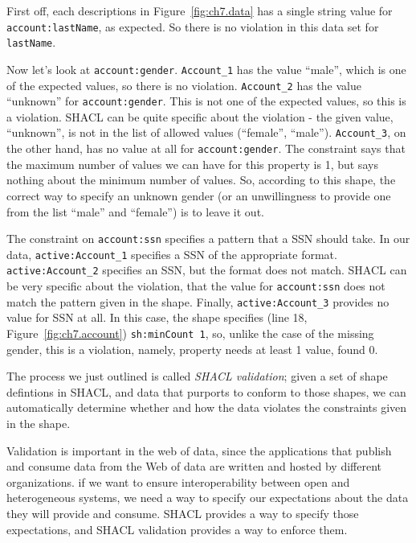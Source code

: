 First off, each descriptions in Figure~\ref{fig:ch7.data} has a single string value for
\texttt{account:lastName}, as expected.  So there is no violation in this data set for \texttt{lastName}.

Now let's look at \texttt{account:gender}.  \texttt{Account\_1} has the
value ``male'', which is one of the expected values, so there is no
violation.  \texttt{Account\_2} has the value ``unknown'' for \texttt{account:gender}.  This is not one 
of the expected values, so this is a violation.  SHACL can be quite specific about
the violation - the given value, ``unknown'', is not in the list of allowed
values (``female'', ``male'').  \texttt{Account\_3}, on the other hand, has 
no value at all for \texttt{account:gender}.  The constraint says that the
maximum number of values we can have for this property is 1, but says nothing about the
minimum number of values.  So, according to this shape, the correct way to specify
an unknown gender (or an unwillingness to provide one from the list ``male''
and ``female'') is to leave it out. 

The constraint on \texttt{account:ssn} specifies a pattern that a SSN should take.
In our data, \texttt{active:Account\_1} specifies a SSN of the appropriate format.
\texttt{active:Account\_2} specifies an SSN, but the format does not match.  SHACL can
be very specific about the violation, that the value for \texttt{account:ssn}
does not match the pattern given in the shape.  Finally, \texttt{active:Account\_3}  provides no value for SSN at all.  In this case, the shape specifies (line 18, Figure~\ref{fig:ch7.account}) \texttt{sh:minCount 1}, so, unlike the case of the missing
gender, this is a violation, namely, property needs at least 1 value, found 0.

The process we just outlined is called \emph{SHACL validation}; given a set of
shape defintions in SHACL, and data that purports to conform to those shapes,
we can automatically determine whether and how the data violates the constraints
given in the shape.

Validation is important in the web of data, since the applications
that publish and consume data from the Web of data are  written and
hosted by different organizations.  if we want to ensure
interoperability between open and heterogeneous systems, we need a way
to specify our expectations about the data they will provide and
consume.  SHACL provides a way to specify those expectations, and
SHACL validation provides a way to enforce them.



